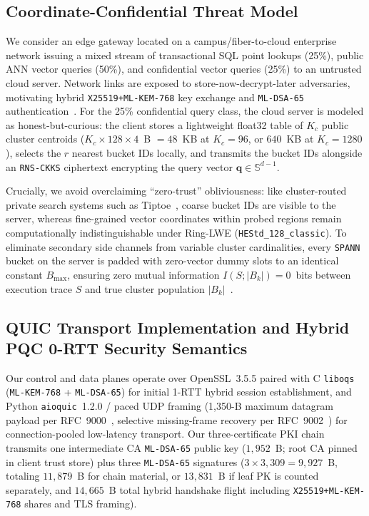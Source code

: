 \documentclass[10pt,journal,compsoc]{IEEEtran}
\begin{document}
\subsection{Coordinate-Confidential Threat Model}
We consider an edge gateway located on a campus/fiber-to-cloud enterprise network issuing a mixed stream of transactional SQL point lookups (25\%), public ANN vector queries (50\%), and confidential vector queries (25\%) to an untrusted cloud server. Network links are exposed to store-now-decrypt-later adversaries, motivating hybrid \nolinkurl{X25519+ML-KEM-768} key exchange and \texttt{ML-DSA-65} authentication~\cite{fips203,fips204}. For the 25\% confidential query class, the cloud server is modeled as honest-but-curious: the client stores a lightweight float32 table of $K_c$ public cluster centroids ($K_c \times 128 \times 4$~B $= 48$~KB at $K_c=96$, or $640$~KB at $K_c=1280$), selects the $r$ nearest bucket IDs locally, and transmits the bucket IDs alongside an \texttt{RNS-CKKS} ciphertext encrypting the query vector $\mathbf{q} \in \mathbb{S}^{d-1}$.

Crucially, we avoid overclaiming ``zero-trust'' obliviousness: like cluster-routed private search systems such as Tiptoe~\cite{henzinger2023tiptoe}, coarse bucket IDs are visible to the server, whereas fine-grained vector coordinates within probed regions remain computationally indistinguishable under Ring-LWE (\nolinkurl{HEStd_128_classic}). To eliminate secondary side channels from variable cluster cardinalities, every \texttt{SPANN} bucket on the server is padded with zero-vector dummy slots to an identical constant $B_{\max}$, ensuring zero mutual information $I(S; |B_k|) = 0$~bits between execution trace $S$ and true cluster population $|B_k|$~\cite{paninski2003entropy}.

\subsection{QUIC Transport Implementation and Hybrid PQC 0-RTT Security Semantics}
Our control and data planes operate over OpenSSL~3.5.5 paired with C \texttt{liboqs} (\texttt{ML-KEM-768} + \texttt{ML-DSA-65}) for initial 1-RTT hybrid session establishment, and Python \texttt{aioquic}~1.2.0 / paced UDP framing (1,350-B maximum datagram payload per RFC~9000~\cite{rfc9000}, selective missing-frame recovery per RFC~9002~\cite{rfc9002}) for connection-pooled low-latency transport. Our three-certificate PKI chain transmits one intermediate CA \texttt{ML-DSA-65} public key ($1,952$~B; root CA pinned in client trust store) plus three \texttt{ML-DSA-65} signatures ($3 \times 3,309 = 9,927$~B, totaling $11,879$~B for chain material, or $13,831$~B if leaf PK is counted separately, and $14,665$~B total hybrid handshake flight including \nolinkurl{X25519+ML-KEM-768} shares and TLS framing).
\end{document}

